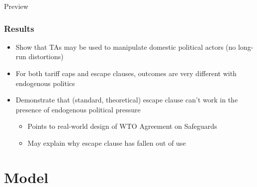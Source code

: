 \documentclass[handout]{beamer}
\begin{document}
\begin{frame}{Preview}
\frametitle{Results}

\pause
\begin{itemize}[<+->]
	\item Show that TAs may be used to manipulate domestic political actors (no long-run distortions)
	\item For both tariff caps and escape clauses, outcomes are very different with endogenous politics
	\item Demonstrate that (standard, theoretical) escape clause can't work in the presence of endogenous political pressure
		\begin{itemize}
			\item Points to real-world design of WTO Agreement on Safeguards
			\item May explain why escape clause has fallen out of use
		\end{itemize}
\end{itemize}
\end{frame}

\section{Model}
\end{document}
